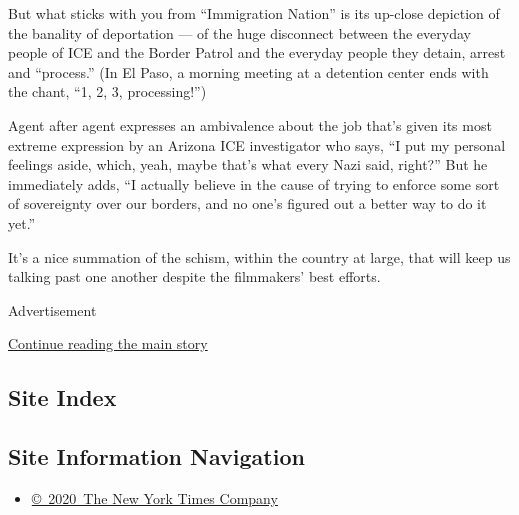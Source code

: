 But what sticks with you from ``Immigration Nation'' is its up-close
depiction of the banality of deportation --- of the huge disconnect
between the everyday people of ICE and the Border Patrol and the
everyday people they detain, arrest and ``process.'' (In El Paso, a
morning meeting at a detention center ends with the chant, ``1, 2, 3,
processing!'')

Agent after agent expresses an ambivalence about the job that's given
its most extreme expression by an Arizona ICE investigator who says, ``I
put my personal feelings aside, which, yeah, maybe that's what every
Nazi said, right?'' But he immediately adds, ``I actually believe in the
cause of trying to enforce some sort of sovereignty over our borders,
and no one's figured out a better way to do it yet.''

It's a nice summation of the schism, within the country at large, that
will keep us talking past one another despite the filmmakers' best
efforts.

Advertisement

\protect\hyperlink{after-bottom}{Continue reading the main story}

\hypertarget{site-index}{%
\subsection{Site Index}\label{site-index}}

\hypertarget{site-information-navigation}{%
\subsection{Site Information
Navigation}\label{site-information-navigation}}

\begin{itemize}
\tightlist
\item
  \href{https://help.nytimes3xbfgragh.onion/hc/en-us/articles/115014792127-Copyright-notice}{©~2020~The
  New York Times Company}
\end{itemize}

